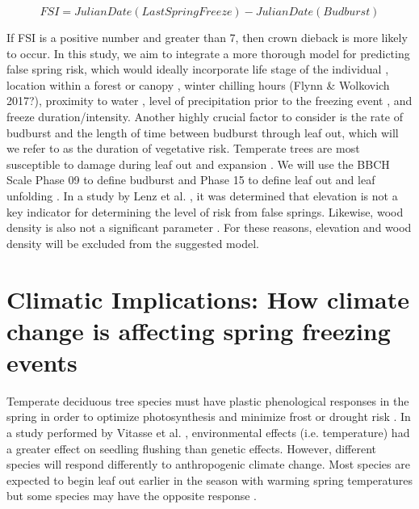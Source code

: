 \documentclass{article}\usepackage[]{graphicx}\usepackage[]{color}
\begin{document}
\[ FSI = Julian Date (Last Spring Freeze) - Julian Date (Budburst) \]

If FSI is a positive number and greater than 7, then crown dieback is more likely to occur. In this study, we aim to integrate a more thorough model for predicting false spring risk, which would ideally incorporate life stage of the individual \citep{Caffarra2011}, location within a forest or canopy \citep{Augspurger2013}
, winter chilling hours (Flynn \& Wolkovich 2017?), proximity to water \citep{Gu2008}
, level of precipitation prior to the freezing event \citep{Anderegg2013}, and freeze duration/intensity. Another highly crucial factor to consider is the rate of budburst and the length of time between budburst through leaf out, which will we refer to as the duration of vegetative risk. Temperate trees are most susceptible to damage during leaf out and expansion \citep{Vitasse2014}. We will use the BBCH Scale Phase 09 to define budburst and Phase 15 to define leaf out and leaf unfolding \citep{Meier2001}. In a study by Lenz et al. %
, it was determined that elevation is not a key indicator for determining the level of risk from false springs. Likewise, wood density is also not a significant parameter \citep{Augspurger2009}. For these reasons, elevation and wood density will be excluded from the suggested model. 

\section{Climatic Implications: How climate change is affecting spring freezing events}
Temperate deciduous tree species must have plastic phenological responses in the spring in order to optimize photosynthesis and minimize frost or drought risk \citep{Polgar2011}. In a study performed by Vitasse et al. %
, environmental effects (i.e. temperature) had a greater effect on seedling flushing than genetic effects. However, different species will respond differently to anthropogenic climate change. Most species are expected to begin leaf out earlier in the season with warming spring temperatures but some species may have the opposite response \citep{Xin2016, Cleland2006, Yu2010}.
\end{document}
